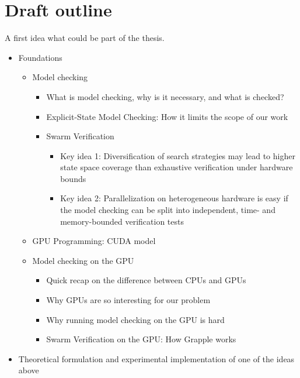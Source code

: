 \documentclass[a4paper]{scrartcl}
\begin{document}
\section{Draft outline}

A first idea what could be part of the thesis.

\begin{itemize}
    \item Foundations
          \begin{itemize}
              \item Model checking
                    \begin{itemize}
                        \item What is model checking, why is it necessary, and what is checked?
                        \item Explicit-State Model Checking: How it limits the scope of our work
                        \item Swarm Verification
                              \begin{itemize}
                                  \item Key idea 1: Diversification of search strategies may lead to higher state space coverage than exhaustive verification under hardware bounds
                                  \item Key idea 2: Parallelization on heterogeneous hardware is easy if the model checking can be split into independent, time- and memory-bounded verification tests
                              \end{itemize}
                    \end{itemize}
              \item GPU Programming: CUDA model
              \item Model checking on the GPU
                    \begin{itemize}
                        \item Quick recap on the difference between CPUs and GPUs
                        \item Why GPUs are so interesting for our problem
                        \item Why running model checking on the GPU is hard
                        \item Swarm Verification on the GPU: How Grapple works
                    \end{itemize}
          \end{itemize}
    \item Theoretical formulation and experimental implementation of one of the ideas above

\end{itemize}
\end{document}
